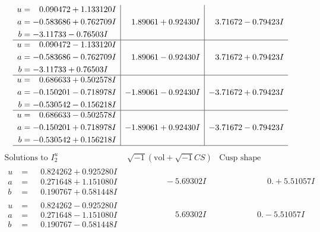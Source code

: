 \documentclass[1p]{elsarticle_modified}
\theoremstyle{definition}
\newcommand{\I}{\sqrt{-1}}
\begin{document}
$$\begin{array}{c|c|c}
\begin{aligned}
u &= \phantom{-}0.090472 + 1.133120 I \\
a &= -0.583686 + 0.762709 I \\
b &= -3.11733 - 0.76503 I\end{aligned}
 & \phantom{-}1.89061 + 0.92430 I & \phantom{-}3.71672 - 0.79423 I \\ \hline\begin{aligned}
u &= \phantom{-}0.090472 - 1.133120 I \\
a &= -0.583686 - 0.762709 I \\
b &= -3.11733 + 0.76503 I\end{aligned}
 & \phantom{-}1.89061 - 0.92430 I & \phantom{-}3.71672 + 0.79423 I \\ \hline\begin{aligned}
u &= \phantom{-}0.686633 + 0.502578 I \\
a &= -0.150201 - 0.718978 I \\
b &= -0.530542 - 0.156218 I\end{aligned}
 & -1.89061 - 0.92430 I & -3.71672 + 0.79423 I \\ \hline\begin{aligned}
u &= \phantom{-}0.686633 - 0.502578 I \\
a &= -0.150201 + 0.718978 I \\
b &= -0.530542 + 0.156218 I\end{aligned}
 & -1.89061 + 0.92430 I & -3.71672 - 0.79423 I\\
 \hline 
 \end{array}$$\newpage$$\begin{array}{c|c|c}  
\text{Solutions to }I^u_{2}& \I (\text{vol} + \sqrt{-1}CS) & \text{Cusp shape}\\
 \hline 
\begin{aligned}
u &= \phantom{-}0.824262 + 0.925280 I \\
a &= \phantom{-}0.271648 + 1.151080 I \\
b &= \phantom{-}0.190767 + 0.581448 I\end{aligned}
 & \phantom{-0.000000 } -5.69302 I & \phantom{-0.000000 -}0. + 5.51057 I \\ \hline\begin{aligned}
u &= \phantom{-}0.824262 - 0.925280 I \\
a &= \phantom{-}0.271648 - 1.151080 I \\
b &= \phantom{-}0.190767 - 0.581448 I\end{aligned}
 & \phantom{-0.000000 -}5.69302 I & \phantom{-0.000000 } 0. - 5.51057 I \\ \hline\begin{aligned}

\end{aligned}
\end{array}$$
\end{document}
